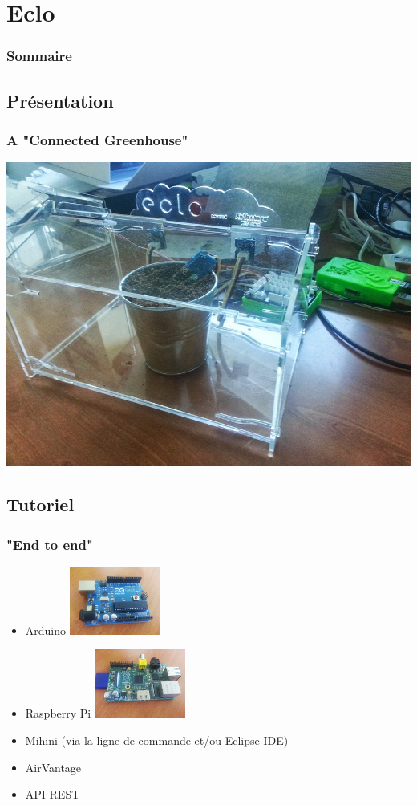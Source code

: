 \documentclass[slidetop,11pt]{beamer}
\begin{document}
\section{Eclo}

\begin{frame}
    \frametitle{Sommaire}
\end{frame}

\subsection{Présentation}
\begin{frame}
    \frametitle{A "Connected Greenhouse"}
    \includegraphics[width=\linewidth]{img/eclo.jpg}
\end{frame}

\subsection{Tutoriel}
\begin{frame}
    \frametitle{"End to end"}
    \begin{itemize}
        \item Arduino
            \includegraphics[width=3cm]{img/arduino.jpg}
        \item Raspberry Pi
            \includegraphics[width=3cm]{img/rpi.jpg}
        \item Mihini (via la ligne de commande et/ou Eclipse IDE)
        \item AirVantage
        \item API REST
    \end{itemize}
\end{frame}
\end{document}
